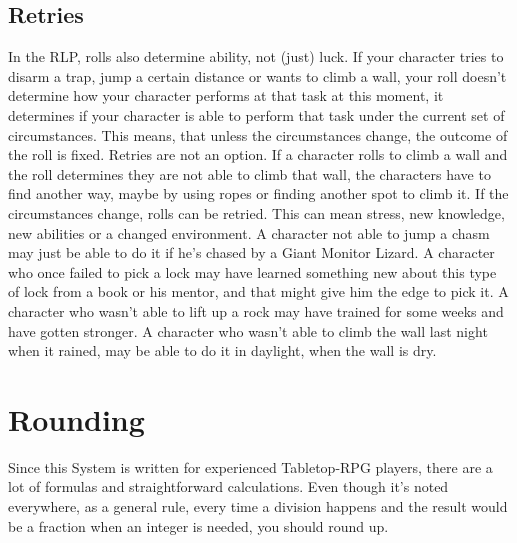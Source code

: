\subsection{Retries}\label{subsec:retries}
In the RLP, rolls also determine ability, not (just) luck.
If your character tries to disarm a trap, jump a certain distance or wants to climb a wall, your roll doesn't determine how your character performs at that task at this moment, it determines if your character is able to perform that task under the current set of circumstances.
This means, that unless the circumstances change, the outcome of the roll is fixed.
Retries are not an option.
If a character rolls to climb a wall and the roll determines they are not able to climb that wall, the characters have to find another way, maybe by using ropes or finding another spot to climb it.
If the circumstances change, rolls can be retried.
This can mean stress, new knowledge, new abilities or a changed environment.
A character not able to jump a chasm may just be able to do it if he's chased by a Giant Monitor Lizard.
A character who once failed to pick a lock may have learned something new about this type of lock from a book or his mentor, and that might give him the edge to pick it.
A character who wasn't able to lift up a rock may have trained for some weeks and have gotten stronger.
A character who wasn't able to climb the wall last night when it rained, may be able to do it in daylight, when the wall is dry.


\section{Rounding}\label{sec:rounding}
Since this System is written for experienced Tabletop-RPG players, there are a lot of formulas and straightforward calculations.
Even though it's noted everywhere, as a general rule, every time a division happens and the result would be a fraction when an integer is needed, you should round up.

